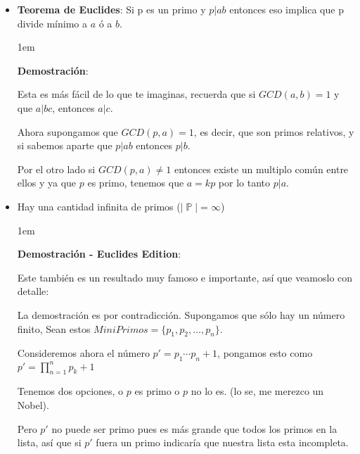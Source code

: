 \documentclass[12pt, fleqn]{report}                             %
\newenvironment{SmallIndentation}[1][0.75em]                    %
    {\begin{adjustwidth}{#1}{}\begin{footnotesize}}                 %
    {\end{footnotesize}\end{adjustwidth}}                           %
\DeclareMathOperator \Naturals  {\mathbb{N}}                     %
\DeclareMathOperator \Primes    {\mathbb{P}}                     %
\begin{document}
        \begin{itemize}

            \item \textbf{Teorema de Euclides}:
                Si p es un primo y $p|ab$ entonces eso implica que p divide mínimo
                a $a$ ó a $b$.

                \begin{SmallIndentation}[1em]
                    \textbf{Demostración}:

                    Esta es más fácil de lo que te imaginas, recuerda que si
                    $GCD(a,b) = 1$ y que $a|bc$, entonces $a|c$.

                    Ahora supongamos que $GCD(p,a) = 1$, es decir, que son primos
                    relativos, y si sabemos aparte que $p|ab$ entonces $p|b$.

                    Por el otro lado si $GCD(p, a) \neq 1$ entonces existe un multiplo
                    común entre ellos y ya que $p$ es primo, tenemos que $a=kp$ por lo
                    tanto $p|a$.

                \end{SmallIndentation}


            \item Hay una cantidad infinita de primos ($|\Primes| = \infty$)

                \begin{SmallIndentation}[1em]
                    \textbf{Demostración - Euclides Edition}:

                    Este también es un resultado muy famoso e importante, así
                    que veamoslo con detalle:

                    La demostración es por contradicción.
                    Supongamos que sólo hay un número finito, Sean estos 
                    $MiniPrimos = \{ p_1, p_2, \dots, p_n\}$.

                    Consideremos ahora el número $p'=p_1 \cdots p_n + 1$,
                    pongamos esto como $p' = \prod_{n=1}^{n} p_k +1$

                    Tenemos dos opciones, o $p$ es primo o $p$ no lo es.
                    (lo se, me merezco un Nobel).

                    Pero $p'$ no puede ser primo pues es más grande que
                    todos los primos en la lista, así que si $p'$ fuera
                    un primo indicaría que nuestra lista esta incompleta.


\end{SmallIndentation}
\end{itemize}
\end{document}
